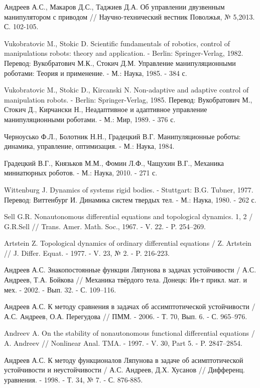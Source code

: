\begin{thebibliography}{10}
	Андреев А.С., Макаров Д.С., Таджиев Д.А. Об управлении двузвенным манипулятором с приводом // Научно-технический вестник Поволжья, № 5,2013. С. 102-105.
	
	Vukobratovic M., Stokic D. Scientific fundamentals of robotics, control of manipulations robots: theory and application. - Berlin: Springer-Verlag, 1982. Перевод: Вукобратович М.К., Стокич Д.М. Управление манипуляционными роботами: Теория и применение. - М.: Наука, 1985. - 384 с.
	
	Vukobratovic M., Stokic D., Kircanski N. Non-adaptive and adaptive control of manipulation robots. - Berlin: Springer-Verlag, 1985. Перевод: Вукобратович М., Стокич Д., Кирчански Н., Неадаптивное и адаптивное управление манипуляционными роботами. - М.: Мир, 1989. - 376 с.
	
	Черноусько Ф.Л., Болотник Н.Н., Градецкий В.Г. Манипуляционные роботы: динамика, управление, оптимизация. - М.: Наука, 1984.
	
	Градецкий В.Г., Князьков М.М., Фомин Л.Ф., Чащухин В.Г., Механика миниатюрных роботов. - М.: Наука, 2010. - 271 с.
	
	Wittenburg J. Dynamics of systems rigid bodies. - Stuttgart: B.G. Tubner, 1977. Перевод: Виттенбург И. Динамика систем твердых тел. - М.: Наука, 1980. - 262 с.
	
	Sell G.R. Nonautonomous differential equations and topological dynamics. 1, 2 / G.R.Sell // Trans. Amer. Math. Soc., 1967. - V. 22. - P. 254--269.
	
	Artstein Z. Topological dynamics of ordinary differential equations / Z. Artstein // J. Differ. Equat. - 1977. - V. 23, № 2. - P. 216-223.
	
	Андреев А.С. Знакопостоянные функции Ляпунова в задачах устойчивости / А.С. Андреев, Т.А. Бойкова // Механика твёрдого тела. Донецк: Ин-т прикл. мат. и мех. - 2002. - Вып. 32. - С. 109--116.
	
	Андреев А.С. К методу сравнения в задачах об ассимптотической устойчивости / А.С. Андреев, О.А. Перегудова // ПММ. - 2006. - Т. 70, Вып. 6. - С. 965--976.
	
	Andreev A. On the stability of nonautonomous functional differential equations / A. Andreev // Nonlinear Anal. TMA. - 1997. - V. 30, Part 5. - P. 2847--2854.
	
	Андреев А.С. К методу функционалов Ляпунова в задаче об асимптотической устойчивости и неустойчивости / А.С. Андреев, Д.Х. Хусанов // Дифференц. уравнения. - 1998. - Т. 34, № 7. - С. 876-885. 
	

\end{thebibliography}
